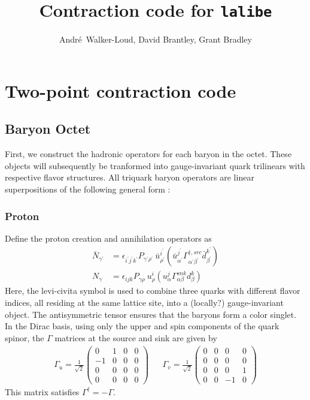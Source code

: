\documentclass[prd,12pt,superscriptaddress,tightenlines,nofootinbib]{revtex4}
\def\a{{\alpha}}
\def\b{{\beta}}
\def\g{{\gamma}}
\def\G{{\Gamma}}
\def\ip{{i^\prime}}
\def\jp{{j^\prime}}
\def\kp{{k^\prime}}
\def\ap{{\alpha^\prime}}
\def\bp{{\beta^\prime}}
\def\gp{{\gamma^\prime}}
\def\rp{{\rho^\prime}}
\begin{document}
\title{Contraction code for \texttt{lalibe}}

\author{Andr\'{e}~Walker-Loud, David Brantley, Grant Bradley}


\maketitle

\section{Two-point contraction code}
\subsection{Baryon Octet}
First, we construct the hadronic operators for each baryon in the octet. These objects will subsequently be 
tranformed into gauge-invariant quark trilinears with respective flavor structures. All triquark baryon operators are
linear superpositions of the following general form :



\subsubsection{Proton}

Define the proton creation and annihilation operators as
\begin{align}
\bar{N}_{\gp} &= \epsilon_{\ip\jp\kp} P_{\gp\rp}\ \bar{u}^\ip_\rp (\bar{u}^{\jp}_{\ap} \G^{\dagger,src}_{\ap\bp} \bar{d}^\kp_\bp ) 
\\
N_{\g} &= \epsilon_{ijk} P_{\g\rho}\ u^i_\rho (u^j_\a \G^{snk}_{\a\b} d^k_\b ) 
\end{align}
Here, the levi-civita symbol is used to combine three quarks with different flavor indices, all residing 
at the same lattice site, into a (locally?) gauge-invariant object. The antisymmetric tensor ensures that the baryons 
form a color singlet. 
In the Dirac basis, using only the upper and spin components of the quark spinor, the $\G$ matrices at the source and sink are given by
\begin{align}
\G_{u} = \frac{1}{\sqrt{2}}\begin{pmatrix}
	0& 1& 0& 0\\
	-1& 0& 0& 0\\
	0& 0& 0& 0\\
	0& 0& 0& 0
	\end{pmatrix} && \G_{v} =  \frac{1}{\sqrt{2}}\begin{pmatrix}
	0& 0& 0& 0\\
	0& 0& 0& 0\\
	0& 0& 0& 1\\
	0& 0& -1& 0
	\end{pmatrix}
\end{align}
This matrix satisfies $\G^\dagger = -\G$.
\end{document}
